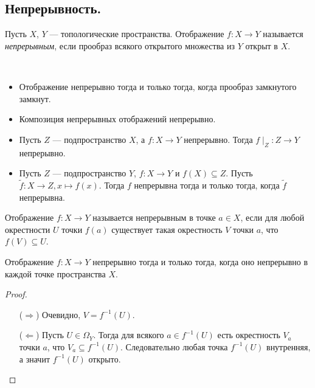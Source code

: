\documentclass[12pt,a4paper]{article}
\begin{document}
    \subsection{Непрерывность.}

    \begin{definition}
        Пусть $X$, $Y$ --- топологические пространства. Отображение $f: X \to Y$ называется \emph{непрерывным}, если прообраз всякого открытого множества из $Y$ открыт в $X$.
    \end{definition}

    \begin{theorem}\ 
        \begin{itemize}
            \item Отображение непрерывно тогда и только тогда, когда прообраз замкнутого замкнут.
            \item Композиция непрерывных отображений непрерывно.
            \item Пусть $Z$ --- подпространство $X$, а $f: X \to Y$ непрерывно. Тогда $f{\mid}_Z: Z \to Y$ непрерывно.
            \item Пусть $Z$ --- подпространство $Y$, $f: X \to Y$ и $f(X) \subseteq Z$. Пусть $\widetilde f: X \to Z, x \mapsto f(x)$. Тогда $f$ непрерывна тогда и только тогда, когда $\widetilde f$ непрерывна.
        \end{itemize}
    \end{theorem}

    \begin{definition}
        Отображение $f: X \to Y$ называется непрерывным в точке $a \in X$, если для любой окрестности $U$ точки $f(a)$ существует такая окрестность $V$ точки $a$, что $f(V) \subseteq U$.
    \end{definition}

    \begin{theorem}
        Отображение $f: X \to Y$ непрерывно тогда и только тогда, когда оно непрерывно в каждой точке пространства $X$.
    \end{theorem}

    \begin{proof}
        \begin{itemize}
            \item[($\Rightarrow$)] Очевидно, $V = f^{-1}(U)$.
            \item[($\Leftarrow$)] Пусть $U \in \Omega_Y$. Тогда для всякого $a \in f^{-1}(U)$ есть окрестность $V_a$ точки $a$, что $V_a \subseteq f^{-1}(U)$. Следовательно любая точка $f^{-1}(U)$ внутренняя, а значит $f^{-1}(U)$ открыто.
        \end{itemize}
    \end{proof}
\end{document}
